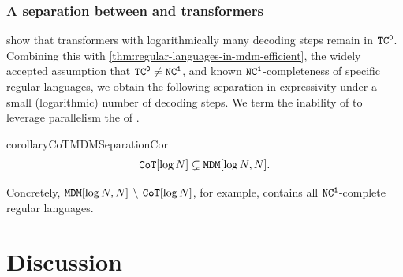 \documentclass{article} %
\begin{document}
\subsubsection{A separation between \eMDMsAcr  and \CoTAcr transformers}
\citet{merrill2024the,li2024chain} show that \CoTAcr transformers with logarithmically many decoding steps remain in ${{{{{{\mathtt{TC}}}^{\mathtt{0}}}}}}$.
Combining this with \cref{thm:regular-languages-in-mdm-efficient}, the widely accepted assumption that ${{{{{{\mathtt{TC}}}^{\mathtt{0}}}}}} \neq {{{{{{\mathtt{NC}}}^{\mathtt{1}}}}}}$, and known ${{{{{{\mathtt{NC}}}^{\mathtt{1}}}}}}$-completeness of specific regular languages, we obtain the following separation in expressivity under a small (logarithmic) number of decoding steps.
We term the inability of \CoTAcr to leverage parallelism the  of \CoTAcr.
\begin{restatable}{corollary}{CoTMDMSeparationCor} \label{thm:cot-mdm-separation}
   \begin{equation}
      {\mathtt{CoT}}[\log{{N}}] \subsetneq {\mathtt{MDM}}[\log{{N}}, {{N}}].
   \end{equation}
\end{restatable}
Concretely, ${\mathtt{MDM}}[\log{{N}}, {{N}}] \, \setminus \, {\mathtt{CoT}}[\log{{N}}]$, for example, contains all ${{{{{{\mathtt{NC}}}^{\mathtt{1}}}}}}$-complete regular languages.



\section{Discussion} \label{sec:discussion}
\end{document}
